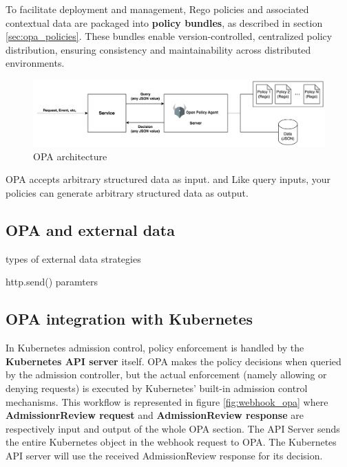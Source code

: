 To facilitate deployment and management, Rego policies and associated contextual data are packaged into \textbf{policy bundles}, as described in section \ref{sec:opa_policies}. These bundles enable version-controlled, centralized policy distribution, ensuring consistency and maintainability across distributed environments. \newline


\begin{figure}[htb]
\centering
\includegraphics[width=1\linewidth]{images/OPA.png}
\caption{OPA architecture}
\label{fig:opa_architecture}
\end{figure}


OPA accepts arbitrary structured data as input.
and  Like query inputs, your policies can generate arbitrary structured data as output.

\subsection{OPA and external data}

types of external data strategies

http.send()
paramters 

\subsection{OPA integration with Kubernetes}

In Kubernetes admission control, policy enforcement is handled by the \textbf{Kubernetes API server} itself. OPA makes the policy decisions when queried by the admission controller, but the actual enforcement (namely allowing or denying requests) is executed by Kubernetes' built-in admission control mechanisms. This workflow is represented in figure \ref{fig:webhook_opa} where \textbf{AdmissionrReview request} and \textbf{AdmissionReview response} are respectively input and output of the whole OPA section. The API Server sends the entire Kubernetes object in the webhook request to OPA. %
The Kubernetes API server will use the received AdmissionReview response for its decision. \\

